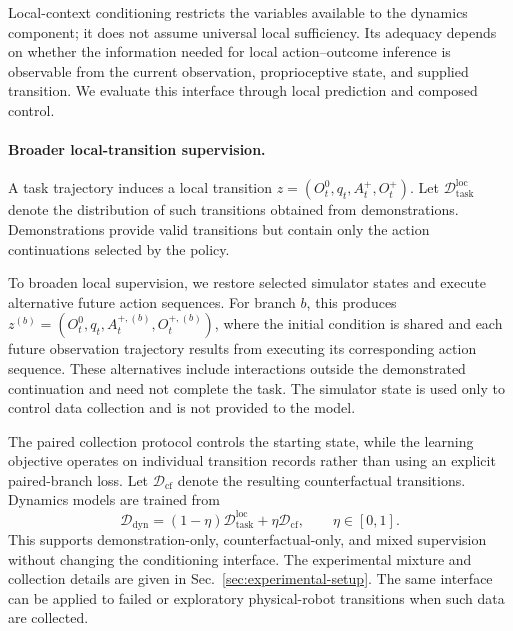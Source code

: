 Local-context conditioning restricts the variables available to the dynamics
component; it does not assume universal local sufficiency. Its adequacy
depends on whether the information needed for local action--outcome inference
is observable from the current observation, proprioceptive state, and supplied
transition. We evaluate this interface through local prediction and composed
control.

\paragraph{Broader local-transition supervision.}
A task trajectory induces a local transition
$z=( O_t^0,q_t, A_t^+, O_t^+)$.
Let $\mathcal D_{\mathrm{task}}^{\mathrm{loc}}$ denote the distribution of
such transitions obtained from demonstrations. Demonstrations provide valid
transitions but contain only the action continuations selected by the
policy.

To broaden local supervision, we restore selected simulator states and
execute alternative future action sequences. For branch $b$, this produces
$z^{(b)}=( O_t^0,q_t, A_t^{+,(b)},
 O_t^{+,(b)})$, where the initial condition is shared and each
future observation trajectory results from executing its corresponding
action sequence. These alternatives include interactions outside the
demonstrated continuation and need not complete the task. The simulator
state is used only to control data collection and is not provided to the
model.

The paired collection protocol controls the starting state, while the
learning objective operates on individual transition records rather than
using an explicit paired-branch loss. Let $\mathcal D_{\mathrm{cf}}$ denote
the resulting counterfactual transitions. Dynamics models are trained from
\begin{equation}
\mathcal D_{\mathrm{dyn}}
=
(1-\eta)\mathcal D_{\mathrm{task}}^{\mathrm{loc}}
+
\eta\mathcal D_{\mathrm{cf}},
\qquad
\eta\in[0,1].
\label{eq:dynamics-training-distribution}
\end{equation}
This supports demonstration-only, counterfactual-only, and mixed
supervision without changing the conditioning interface. The experimental
mixture and collection details are given in Sec.~\ref{sec:experimental-setup}.
The same interface can be applied to failed or exploratory physical-robot transitions when such data are collected.

